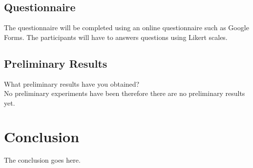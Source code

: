 \documentclass[journal]{IEEEtran}
\begin{document}
\subsection{Questionnaire}
The questionnaire will be completed using an online questionnaire such as Google Forms. The participants will have to answers questions using Likert scales.




\subsection{Preliminary Results}
What preliminary results have you obtained? \\
No preliminary experiments have been therefore there are no preliminary results yet.


\section{Conclusion}
The conclusion goes here.







\end{document}
